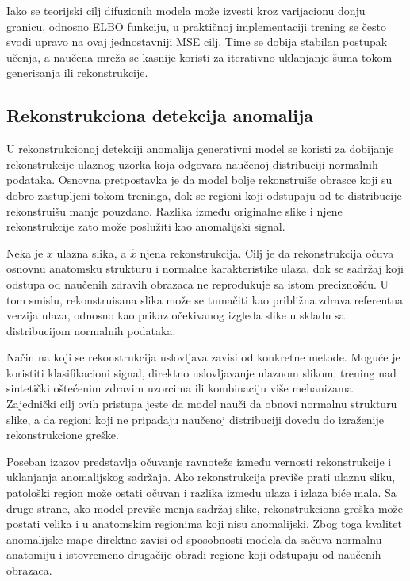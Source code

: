 \documentclass[10pt]{article}
\begin{document}
	Iako se teorijski cilj difuzionih modela može izvesti kroz varijacionu donju granicu, odnosno ELBO funkciju, u praktičnoj implementaciji trening se često svodi upravo na ovaj jednostavniji MSE cilj. Time se dobija stabilan postupak učenja, a naučena mreža se kasnije koristi za iterativno uklanjanje šuma tokom generisanja ili rekonstrukcije.
	
	\subsection{Rekonstrukciona detekcija anomalija}
	
	U rekonstrukcionoj detekciji anomalija generativni model se koristi za dobijanje rekonstrukcije ulaznog uzorka koja odgovara naučenoj distribuciji normalnih podataka. Osnovna pretpostavka je da model bolje rekonstruiše obrasce koji su dobro zastupljeni tokom treninga, dok se regioni koji odstupaju od te distribucije rekonstruišu manje pouzdano. Razlika između originalne slike i njene rekonstrukcije zato može poslužiti kao anomalijski signal.
	
	Neka je $x$ ulazna slika, a $\hat{x}$ njena rekonstrukcija. Cilj je da rekonstrukcija očuva osnovnu anatomsku strukturu i normalne karakteristike ulaza, dok se sadržaj koji odstupa od naučenih zdravih obrazaca ne reprodukuje sa istom preciznošću. U tom smislu, rekonstruisana slika može se tumačiti kao približna zdrava referentna verzija ulaza, odnosno kao prikaz očekivanog izgleda slike u skladu sa distribucijom normalnih podataka.
	
	Način na koji se rekonstrukcija uslovljava zavisi od konkretne metode. Moguće je koristiti klasifikacioni signal, direktno uslovljavanje ulaznom slikom, trening nad sintetički oštećenim zdravim uzorcima ili kombinaciju više mehanizama. Zajednički cilj ovih pristupa jeste da model nauči da obnovi normalnu strukturu slike, a da regioni koji ne pripadaju naučenoj distribuciji dovedu do izraženije rekonstrukcione greške.
	
	Poseban izazov predstavlja očuvanje ravnoteže između vernosti rekonstrukcije i uklanjanja anomalijskog sadržaja. Ako rekonstrukcija previše prati ulaznu sliku, patološki region može ostati očuvan i razlika između ulaza i izlaza biće mala. Sa druge strane, ako model previše menja sadržaj slike, rekonstrukciona greška može postati velika i u anatomskim regionima koji nisu anomalijski. Zbog toga kvalitet anomalijske mape direktno zavisi od sposobnosti modela da sačuva normalnu anatomiju i istovremeno drugačije obradi regione koji odstupaju od naučenih obrazaca.
	
\end{document}
